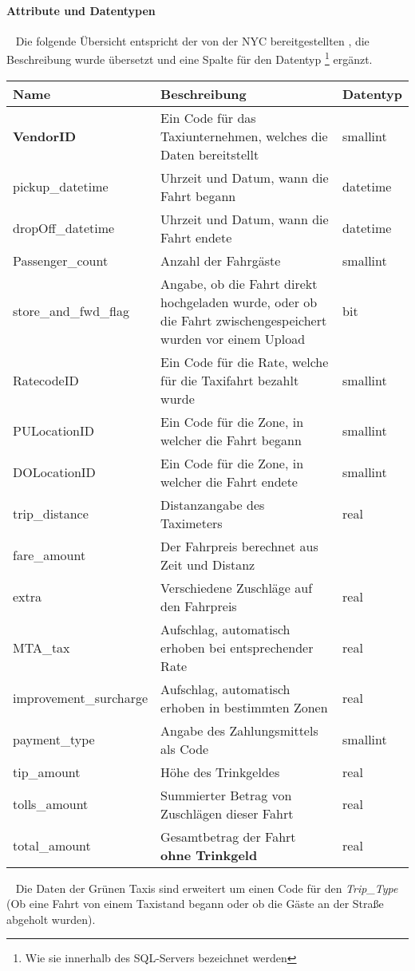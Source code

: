 \paragraph{Attribute und Datentypen} ~\newline
Die folgende Übersicht entspricht der von der NYC bereitgestellten \cite{DataDicYellow}, die Beschreibung wurde übersetzt und eine Spalte für den Datentyp \footnote{Wie sie innerhalb des SQL-Servers bezeichnet werden} ergänzt. 
~\newline
\begin{center}
	\begin{tabular}{|p{}|p{}|p{}|}
		\hline
		Name & Beschreibung & Datentyp  \\ \hline
		\textbf{VendorID} & Ein Code für das Taxiunternehmen, welches die Daten bereitstellt & smallint \\ \hline
		pickup\_datetime & Uhrzeit und Datum, wann die Fahrt begann & datetime \\ \hline
		dropOff\_datetime & Uhrzeit und Datum, wann die Fahrt endete & datetime \\ \hline
		Passenger\_count & Anzahl der Fahrgäste & smallint \\ \hline	
		store\_and\_fwd\_flag & Angabe, ob die Fahrt direkt hochgeladen wurde, oder ob die Fahrt zwischengespeichert wurden vor einem Upload & bit \\ \hline
		RatecodeID & Ein Code für die Rate, welche für die Taxifahrt bezahlt wurde & smallint \\ \hline
		PULocationID & Ein Code für die Zone, in welcher die Fahrt begann & smallint \\ \hline
		DOLocationID & Ein Code für die Zone, in welcher die Fahrt endete & smallint \\ \hline
		trip\_distance & Distanzangabe des Taximeters & real \\ \hline
		fare\_amount & Der Fahrpreis berechnet aus Zeit und Distanz & \\ \hline
		extra & Verschiedene Zuschläge auf den Fahrpreis & real \\ \hline 
		MTA\_tax & Aufschlag, automatisch erhoben bei entsprechender Rate& real \\ \hline
		improvement\_surcharge & Aufschlag, automatisch erhoben in bestimmten Zonen & real \\ \hline
		payment\_type & Angabe des Zahlungsmittels als Code & smallint \\ \hline 
		tip\_amount & Höhe des Trinkgeldes & real \\ \hline
		tolls\_amount & Summierter Betrag von Zuschlägen dieser Fahrt& real \\ \hline
		total\_amount & Gesamtbetrag der Fahrt \textbf{ohne Trinkgeld} & real \\ \hline 
	\end{tabular}
\end{center}
~\newline
Die Daten der Grünen Taxis sind erweitert um einen Code für den \textit{Trip\_Type} (Ob eine Fahrt von einem Taxistand begann oder ob die Gäste an der Straße abgeholt wurden).

